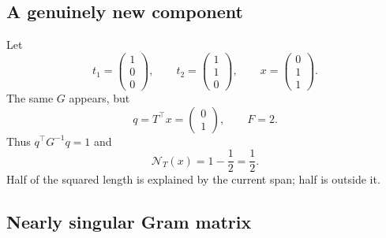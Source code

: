 \documentclass[10pt,twocolumn]{article}
\newcommand{\nov}{\mathcal N}
\begin{document}
\subsection{A genuinely new component}

Let
\begin{equation}
t_1=\begin{pmatrix}1\\0\\0\end{pmatrix},
\qquad
t_2=\begin{pmatrix}1\\1\\0\end{pmatrix},
\qquad
x=\begin{pmatrix}0\\1\\1\end{pmatrix}.
\end{equation}
The same $G$ appears, but
\begin{equation}
q=T^\top x=\begin{pmatrix}0\\1\end{pmatrix},
\qquad
F=2.
\end{equation}
Thus $q^\top G^{-1}q=1$ and
\begin{equation}
\nov_T(x)=1-\frac{1}{2}=\frac12.
\end{equation}
Half of the squared length is explained by the current span; half is outside it.

\subsection{Nearly singular Gram matrix}
\end{document}
